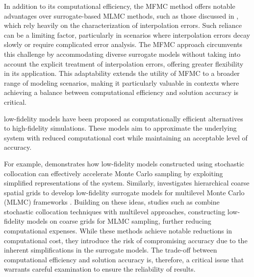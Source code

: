



In addition to its computational efficiency, the MFMC method offers notable advantages over surrogate-based MLMC methods, such as those discussed in \cite{ElLiSa:2025, Li:2024}, which rely heavily on the characterization of interpolation errors. Such reliance can be a limiting factor, particularly in scenarios where interpolation errors decay slowly or require complicated error analysis. The MFMC approach circumvents this challenge by accommodating diverse surrogate models without taking into account the explicit treatment of interpolation errors, offering greater flexibility in its application. This adaptability extends the utility of MFMC to a broader range of modeling scenarios, making it particularly valuable in contexts where achieving a balance between computational efficiency and solution accuracy is critical.





low-fidelity models have been proposed as computationally efficient alternatives to high-fidelity simulations.  These models aim to approximate the underlying system with reduced computational cost while maintaining an acceptable level of accuracy. 




For example, \cite{ElLiSa:2022} demonstrates how low-fidelity models constructed using stochastic collocation can effectively accelerate Monte Carlo sampling by exploiting simplified representations of the system. Similarly, \cite{ElLiSa:2023} investigates hierarchical coarse spatial grids to develop low-fidelity surrogate models for multilevel Monte Carlo (MLMC) frameworks \cite{BaScZo:2011,Gi:2008}. Building on these ideas, studies such as \cite{ElLiSa:2025, Li:2024} combine stochastic collocation techniques with multilevel approaches, constructing low-fidelity models on coarse grids for MLMC sampling, further reducing computational expenses. While these methods achieve notable reductions in computational cost, they introduce the risk of compromising accuracy due to the inherent simplifications in the surrogate models. The trade-off between computational efficiency and solution accuracy is, therefore, a critical issue that warrants careful examination to ensure the reliability of results. 




